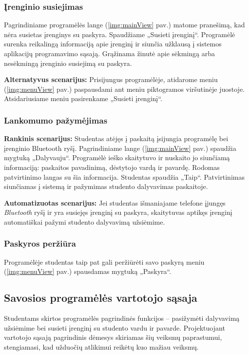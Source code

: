 \documentclass{VUMIFPSkursinis}
\begin{document}
\subsubsection{Įrenginio susiejimas}

Pagrindiniame programėlės lange (\ref{img:mainView} pav.) matome pranešimą, kad nėra susietas įrenginys su paskyra. Spaudžiame „Susieti įrenginį“. Programėlė surenka reikalingą informaciją apie įrenginį ir siunčia užklausą į sistemos aplikacijų programavimo sąsają. Grąžinama žinutė apie sėkmingą arba nesėkmingą įrenginio susiejimą su paskyra.

\textbf{Alternatyvus scenarijus:} Prisijungus programėlėje, atidarome meniu (\ref{img:menuView} pav.) paspausdami ant meniu piktogramos viršutinėje juostoje. Atsidariusiame meniu pasirenkame „Susieti įrenginį“.

\subsubsection{Lankomumo pažymėjimas}

\textbf{Rankinis scenarijus:} Studentas atėjęs į paskaitą įsijungia programėlę bei įrenginio Bluetooth ryšį. Pagrindiniame lange (\ref{img:mainView} pav.) spaudžia mygtuką „Dalyvauju“. Programėlė ieško skaitytuvo ir nuskaito jo siunčiamą informaciją: paskaitos pavadinimą, dėstytojo vardą ir pavardę. Rodomas patvirtinimo langas su šia informacija. Studentas spaudžia „Taip“. Patvirtinimas siunčiamas į sistemą ir pažymimas studento dalyvavimas paskaitoje.

\textbf{Automatizuotas scenarijus:} Jei studentas išmaniajame telefone įjungęs \textit{Bluetooth} ryšį ir yra susiejęs įrenginį su paskyra, skaitytuvas aptikęs įrenginį automatiškai pažymi studento dalyvavimą užsiėmime.

\subsubsection{Paskyros peržiūra}

Programėlėje studentas taip pat gali peržiūrėti savo paskyrą meniu (\ref{img:menuView} pav.) spausdamas mygtuką „Paskyra“.

\subsection{Savosios programėlės vartotojo sąsaja}

Studentams skirtos programėlės pagrindinės funkcijos – pasižymėti dalyvavimą užsiėmime bei susieti įrenginį su studento vardu ir pavarde. Projektuojant vartotojo sąsają pagrindinis dėmesys skiriamas šių veiksmų paprastumui, stengiamasi, kad užduočių atlikimui reikėtų kuo mažiau veiksmų.
\end{document}
